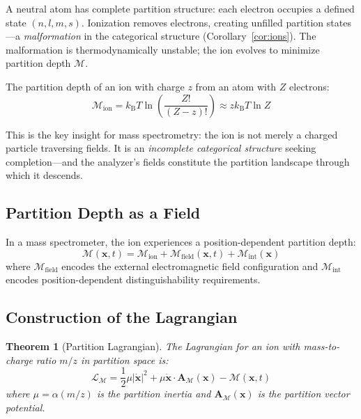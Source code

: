 \documentclass[twocolumn,10pt,a4paper]{article}
\newtheorem{theorem}{Theorem}[section]
\theoremstyle{definition}
\theoremstyle{remark}
\newcommand{\kB}{k_{\mathrm{B}}}
\newcommand{\Depth}{\mathcal{M}}
\newcommand{\Lagr}{\mathcal{L}}
\newcommand{\Apartition}{\mathbf{A}_{\mathcal{M}}}
\newcommand{\partinert}{\mu}
\begin{document}
A neutral atom has complete partition structure: each electron occupies a defined state $(n, l, m, s)$. Ionization removes electrons, creating unfilled partition states---a \emph{malformation} in the categorical structure (Corollary~\ref{cor:ions}). The malformation is thermodynamically unstable; the ion evolves to minimize partition depth $\Depth$.

The partition depth of an ion with charge $z$ from an atom with $Z$ electrons:
\begin{equation}
    \Depth_{\text{ion}} = \kB T \ln\left(\frac{Z!}{(Z-z)!}\right) \approx z\kB T \ln Z
    \label{eq:ion-depth}
\end{equation}

This is the key insight for mass spectrometry: the ion is not merely a charged particle traversing fields. It is an \emph{incomplete categorical structure} seeking completion---and the analyzer's fields constitute the partition landscape through which it descends.

\subsection{Partition Depth as a Field}

In a mass spectrometer, the ion experiences a position-dependent partition depth:
\begin{equation}
    \Depth(\mathbf{x}, t) = \Depth_{\text{ion}} + \Depth_{\text{field}}(\mathbf{x}, t) + \Depth_{\text{int}}(\mathbf{x})
    \label{eq:depth-field}
\end{equation}
where $\Depth_{\text{field}}$ encodes the external electromagnetic field configuration and $\Depth_{\text{int}}$ encodes position-dependent distinguishability requirements.

\subsection{Construction of the Lagrangian}

\begin{theorem}[Partition Lagrangian]
\label{thm:lagrangian}
The Lagrangian for an ion with mass-to-charge ratio $m/z$ in partition space is:
\begin{equation}
    \boxed{\Lagr_{\Depth} = \frac{1}{2}\partinert|\dot{\mathbf{x}}|^2 + \partinert\dot{\mathbf{x}}\cdot\Apartition(\mathbf{x}) - \Depth(\mathbf{x}, t)}
    \label{eq:lagrangian}
\end{equation}
where $\partinert = \alpha(m/z)$ is the partition inertia and $\Apartition(\mathbf{x})$ is the partition vector potential.
\end{theorem}
\end{document}

